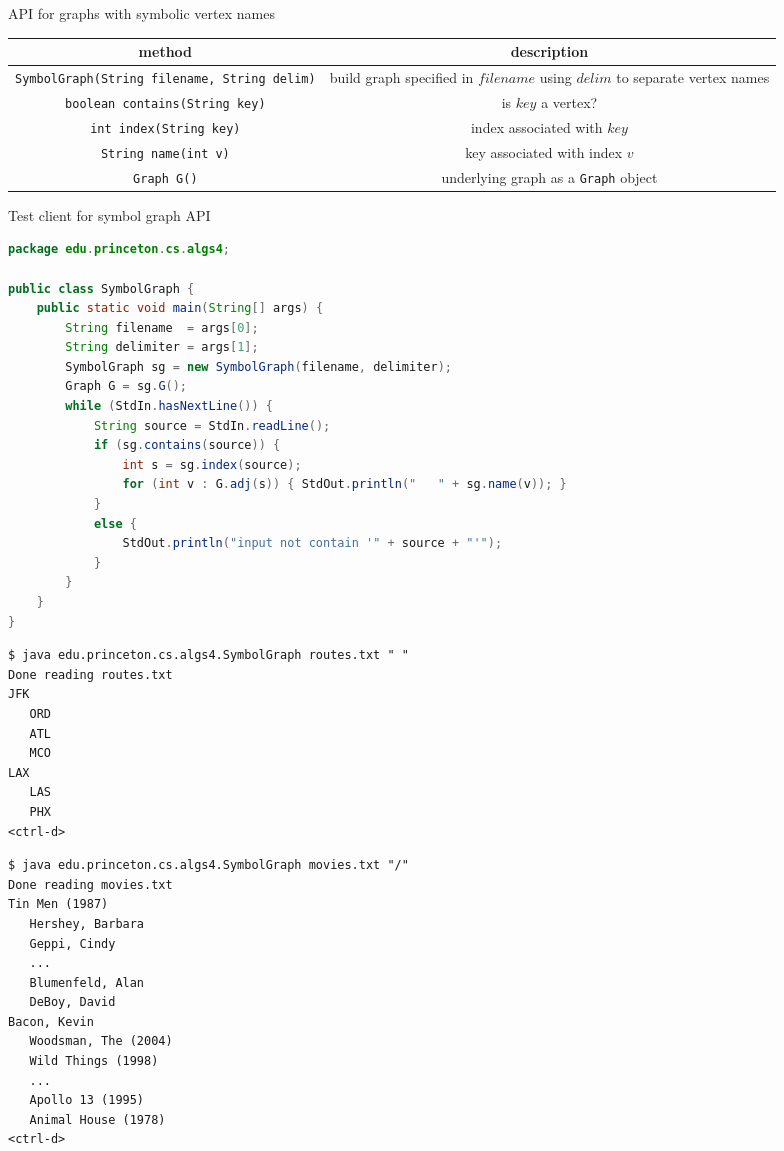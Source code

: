 \documentclass[8pt,a4paper,compress]{beamer}
\begin{document}
\begin{frame}[fragile]
\pause

API for graphs with symbolic vertex names
\begin{center}
\begin{tabular}{cc}
method & description \\ \hline
\lstinline$SymbolGraph(String filename, String delim)$ & \makecell{build graph specified in $filename$ \\ using $delim$ to separate vertex names} \\
\lstinline$boolean contains(String key)$ & is $key$ a vertex? \\
\lstinline$int index(String key)$ & index associated with $key$ \\
\lstinline$String name(int v)$ & key associated with index $v$ \\
\lstinline$Graph G()$ & underlying graph as a \lstinline$Graph$ object
\end{tabular} 
\end{center}

\pause
\bigskip

Test client for symbol graph API
\begin{lstlisting}[language=java,style=focusin]
package edu.princeton.cs.algs4;

public class SymbolGraph {
    public static void main(String[] args) {
        String filename  = args[0];
        String delimiter = args[1];
        SymbolGraph sg = new SymbolGraph(filename, delimiter);
        Graph G = sg.G();
        while (StdIn.hasNextLine()) {
            String source = StdIn.readLine();
            if (sg.contains(source)) {
                int s = sg.index(source);
                for (int v : G.adj(s)) { StdOut.println("   " + sg.name(v)); }
            }
            else {
                StdOut.println("input not contain '" + source + "'");
            }
        }
    }
}
\end{lstlisting}
\end{frame}

\begin{frame}[fragile]
\pause

\begin{lstlisting}[language={},style=focusin]
$ java edu.princeton.cs.algs4.SymbolGraph routes.txt " "
Done reading routes.txt
JFK
   ORD
   ATL
   MCO
LAX
   LAS
   PHX
<ctrl-d>
\end{lstlisting}

\pause

\begin{lstlisting}[language={},style=focusin]
$ java edu.princeton.cs.algs4.SymbolGraph movies.txt "/"
Done reading movies.txt
Tin Men (1987)
   Hershey, Barbara
   Geppi, Cindy
   ...
   Blumenfeld, Alan
   DeBoy, David
Bacon, Kevin
   Woodsman, The (2004)
   Wild Things (1998)
   ...
   Apollo 13 (1995)
   Animal House (1978)
<ctrl-d>
\end{lstlisting}
\end{frame}
\end{document}
